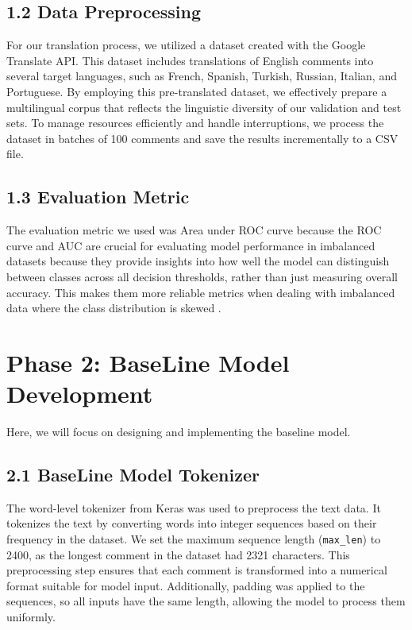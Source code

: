 \documentclass{article}
\begin{document}
\subsection*{1.2 Data Preprocessing}
For our translation process, we utilized a dataset created with the Google Translate API. This dataset includes translations of English comments into several target languages, such as French, Spanish, Turkish, Russian, Italian, and Portuguese. By employing this pre-translated dataset, we effectively prepare a multilingual corpus that reflects the linguistic diversity of our validation and test sets. To manage resources efficiently and handle interruptions, we process the dataset in batches of 100 comments and save the results incrementally to a CSV file.


\subsection*{1.3 Evaluation Metric}
The evaluation metric we used was Area under  ROC curve because the ROC curve and AUC are crucial for evaluating model performance in imbalanced datasets because they provide insights into how well the model can distinguish between classes across all decision thresholds, rather than just measuring overall accuracy. This makes them more reliable metrics when dealing with imbalanced data where the class distribution is skewed .


\section*{Phase 2: BaseLine Model Development}
Here, we will focus on designing and implementing the baseline  model.

\subsection*{2.1 BaseLine Model Tokenizer}
The word-level tokenizer from Keras was used to preprocess the text data. It tokenizes the text by converting words into integer sequences based on their frequency in the dataset. We set the maximum sequence length (\texttt{max\_len}) to 2400, as the longest comment in the dataset had 2321 characters. This preprocessing step ensures that each comment is transformed into a numerical format suitable for model input. Additionally, padding was applied to the sequences, so all inputs have the same length, allowing the model to process them uniformly.
\end{document}
